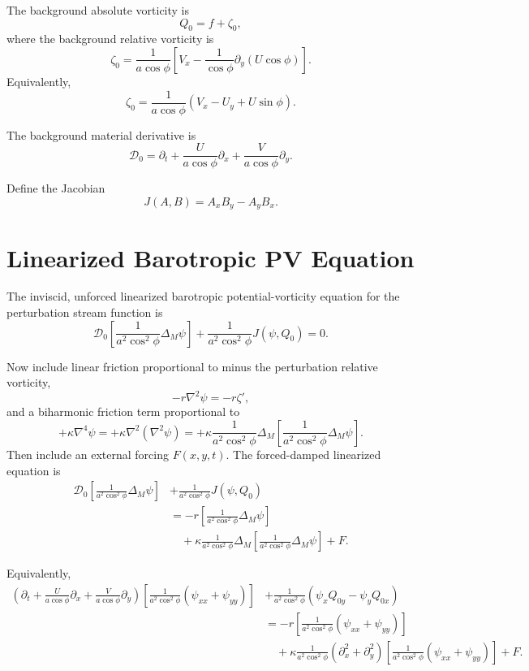 \documentclass[11pt]{article}
\begin{document}
The background absolute vorticity is
\[
Q_0=f+\zeta_0,
\]
where the background relative vorticity is
\[
\zeta_0
=
\frac{1}{a\cos\phi}
\left[
V_x-\frac{1}{\cos\phi}\partial_y(U\cos\phi)
\right].
\]
Equivalently,
\[
\zeta_0
=
\frac{1}{a\cos\phi}
\left(
V_x-U_y+U\sin\phi
\right).
\]

The background material derivative is
\[
\mathcal D_0
=
\partial_t
+
\frac{U}{a\cos\phi}\partial_x
+
\frac{V}{a\cos\phi}\partial_y .
\]

Define the Jacobian
\[
J(A,B)=A_xB_y-A_yB_x .
\]

\section{Linearized Barotropic PV Equation}

The inviscid, unforced linearized barotropic potential-vorticity equation for the perturbation stream function is
\[
\mathcal D_0
\left[
\frac{1}{a^2\cos^2\phi}
\Delta_M\psi
\right]
+
\frac{1}{a^2\cos^2\phi}
J(\psi,Q_0)
=0 .
\]

Now include linear friction proportional to minus the perturbation relative vorticity,
\[
-r\nabla^2\psi=-r\zeta',
\]
and a biharmonic friction term proportional to
\[
+\kappa\nabla^4\psi
=
+\kappa\nabla^2(\nabla^2\psi)
=
+\kappa
\frac{1}{a^2\cos^2\phi}
\Delta_M
\left[
\frac{1}{a^2\cos^2\phi}
\Delta_M\psi
\right].
\]
Then include an external forcing \(F(x,y,t)\). The forced-damped linearized equation is
\[
\boxed{
\begin{aligned}
\mathcal D_0
\left[
\frac{1}{a^2\cos^2\phi}
\Delta_M\psi
\right]
&+
\frac{1}{a^2\cos^2\phi}
J(\psi,Q_0)
\\
&=
-r
\left[
\frac{1}{a^2\cos^2\phi}
\Delta_M\psi
\right]
\\
&\quad
+
\kappa
\frac{1}{a^2\cos^2\phi}
\Delta_M
\left[
\frac{1}{a^2\cos^2\phi}
\Delta_M\psi
\right]
+
F .
\end{aligned}
}
\]

Equivalently,
\[
\boxed{
\begin{aligned}
\left(
\partial_t
+
\frac{U}{a\cos\phi}\partial_x
+
\frac{V}{a\cos\phi}\partial_y
\right)
\left[
\frac{1}{a^2\cos^2\phi}
\left(\psi_{xx}+\psi_{yy}\right)
\right]
&+
\frac{1}{a^2\cos^2\phi}
\left(
\psi_x Q_{0y}-\psi_y Q_{0x}
\right)
\\
&=
-r
\left[
\frac{1}{a^2\cos^2\phi}
\left(\psi_{xx}+\psi_{yy}\right)
\right]
\\
&\quad
+
\kappa
\frac{1}{a^2\cos^2\phi}
\left(
\partial_x^2+\partial_y^2
\right)
\left[
\frac{1}{a^2\cos^2\phi}
\left(\psi_{xx}+\psi_{yy}\right)
\right]
+
F .
\end{aligned}
}
\]
\end{document}
